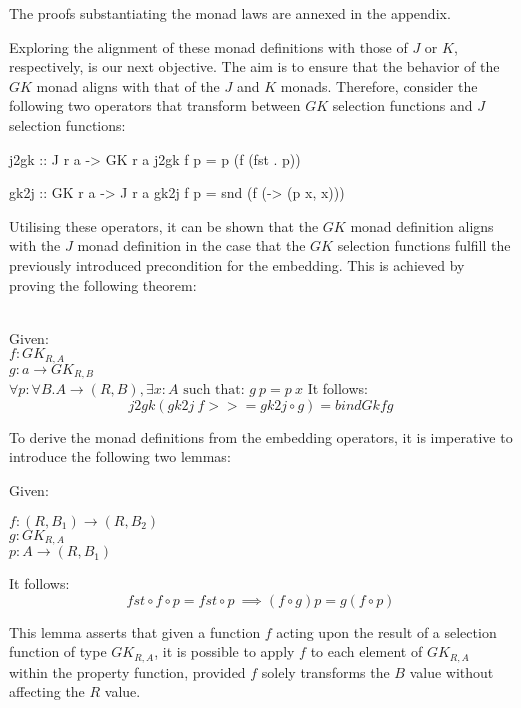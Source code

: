 \documentclass[runningheads]{llncs}
\newenvironment{reasoning}{\begin{adjustwidth}{0.2in}{}}{\end{adjustwidth}}
\begin{document}
The proofs substantiating the monad laws are annexed in the appendix.

Exploring the alignment of these monad definitions with those of \(J\)
or \(K\), respectively, is our next objective. The aim is to ensure that
the behavior of the \(GK\) monad aligns with that of the \(J\) and \(K\)
monads. Therefore, consider the following two operators that transform
between \(GK\) selection functions and \(J\) selection functions:

\begin{code}
j2gk :: J r a -> GK r a
j2gk f p = p (f (fst . p))
\end{code}

\begin{code}
gk2j :: GK r a -> J r a
gk2j f p = snd (f (\x -> (p x, x)))
\end{code}

Utilising these operators, it can be shown that the \(GK\) monad
definition aligns with the \(J\) monad definition in the case that the
\(GK\) selection functions fulfill the previously introduced
precondition for the embedding. This is achieved by proving the
following theorem:

\begin{theorem}\\
Given:\\
  $f : GK_{R,A} $\\
  $g : a \rightarrow GK_{R,B} $\\
  $\forall p : \forall B . A \rightarrow (R,B), \exists x : A \text{ such that: } 
  g\:p = p\:x$
It follows:
  \[j2gk (gk2j\:f >>= gk2j \circ g) = bindGk f g\]
\end{theorem}

To derive the monad definitions from the embedding operators, it is
imperative to introduce the following two lemmas:

\begin{lemma}
Given:
\begin{reasoning}
$f : (R,B_1) \rightarrow (R,B_2)$\\
$g : GK_{R,A}$\\
$p : A \rightarrow (R,B_1)$
\end{reasoning}
It follows:
\[fst \circ f \circ p = fst \circ p\ \implies (f \circ g)p = g (f \circ p)\]
\end{lemma}

This lemma asserts that given a function \(f\) acting upon the result of
a selection function of type \(GK_{R,A}\), it is possible to apply \(f\)
to each element of \(GK_{R,A}\) within the property function, provided
\(f\) solely transforms the \(B\) value without affecting the \(R\)
value.
\end{document}

